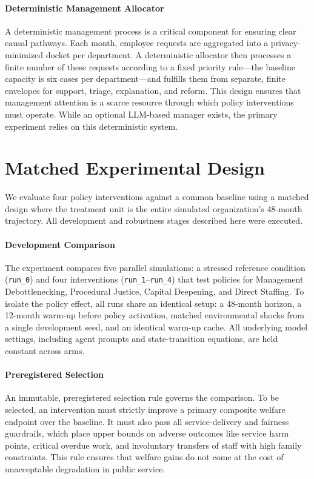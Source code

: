 \documentclass{article}
\begin{document}
\paragraph{Deterministic Management Allocator}
A deterministic management process is a critical component for ensuring clear causal pathways. Each month, employee requests are aggregated into a privacy-minimized docket per department. A deterministic allocator then processes a finite number of these requests according to a fixed priority rule---the baseline capacity is six cases per department---and fulfills them from separate, finite envelopes for support, triage, explanation, and reform. This design ensures that management attention is a scarce resource through which policy interventions must operate. While an optional LLM-based manager exists, the primary experiment relies on this deterministic system.

\section{Matched Experimental Design}
We evaluate four policy interventions against a common baseline using a matched design where the treatment unit is the entire simulated organization's 48-month trajectory. All development and robustness stages described here were executed.

\paragraph{Development Comparison}
The experiment compares five parallel simulations: a stressed reference condition (\texttt{run\_0}) and four interventions (\texttt{run\_1}--\texttt{run\_4}) that test policies for Management Debottlenecking, Procedural Justice, Capital Deepening, and Direct Staffing. To isolate the policy effect, all runs share an identical setup: a 48-month horizon, a 12-month warm-up before policy activation, matched environmental shocks from a single development seed, and an identical warm-up cache. All underlying model settings, including agent prompts and state-transition equations, are held constant across arms.

\paragraph{Preregistered Selection}
An immutable, preregistered selection rule governs the comparison. To be selected, an intervention must strictly improve a primary composite welfare endpoint over the baseline. It must also pass all service-delivery and fairness guardrails, which place upper bounds on adverse outcomes like service harm points, critical overdue work, and involuntary transfers of staff with high family constraints. This rule ensures that welfare gains do not come at the cost of unacceptable degradation in public service.
\end{document}
